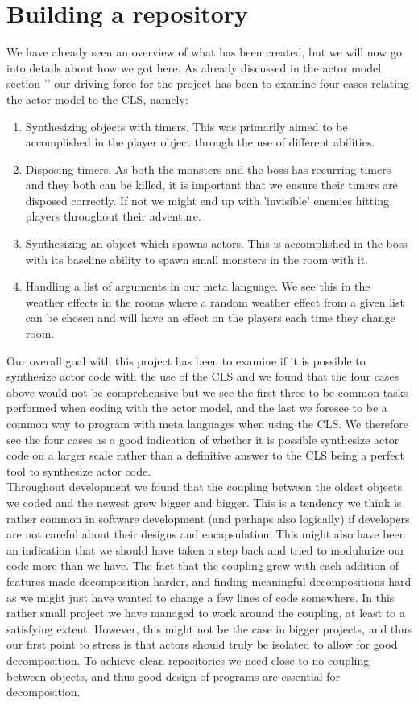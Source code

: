 \section{Building a repository} \label{BuildRep}
We have already seen an overview of what has been created, but we will now go into details about how we got here. As already discussed in the actor model section '' our driving force for the project has been to examine four cases relating the actor model to the CLS, namely:
\begin{enumerate}
	\item Synthesizing objects with timers. This was primarily aimed to be accomplished in the player object through the use of different abilities.
	\item Disposing timers. As both the monsters and the boss has recurring timers and they both can be killed, it is important that we ensure their timers are disposed correctly. If not we might end up with 'invisible' enemies hitting players throughout their adventure.
	\item Synthesizing an object which spawns actors. This is accomplished in the boss with its baseline ability to spawn small monsters in the room with it.
	\item Handling a list of arguments in our meta language. We see this in the weather effects in the rooms where a random weather effect from a given list can be chosen and will have an effect on the players each time they change room.
\end{enumerate}
Our overall goal with this project has been to examine if it is possible to synthesize actor code with the use of the CLS and we found that the four cases above would not be comprehensive but we see the first three to be common tasks performed when coding with the actor model, and the last we foresee to be a common way to program with meta languages when using the CLS. We therefore see the four cases as a good indication of whether it is possible synthesize actor code on a larger scale rather than a definitive answer to the CLS being a perfect tool to synthesize actor code.\\

Throughout development we found that the coupling between the oldest objects we coded and the newest grew bigger and bigger. This is a tendency we think is rather common in software development (and perhaps also logically) if developers are not careful about their designs and encapsulation. This might also have been an indication that we should have taken a step back and tried to modularize our code more than we have. The fact that the coupling grew with each addition of features made decomposition harder, and finding meaningful decompositions hard as we might just have wanted to change a few lines of code somewhere. In this rather small project we have managed to work around the coupling, at least to a satisfying extent. However, this might not be the case in bigger projects, and thus our first point to stress is that actors should truly be isolated to allow for good decomposition. To achieve clean repositories we need close to no coupling between objects, and thus good design of programs are essential for decomposition. 

